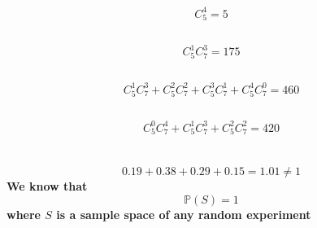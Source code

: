 \documentclass{article}
\begin{document}
    \section{}
        \subsection{}
            \paragraph{
                $$C_5^4=5$$
            }
        \subsection{}
            \paragraph{
                $$C_5^1C_7^3=175$$
            }
        \subsection{}
            \paragraph{
                $$C_5^1C_7^3+C_5^2C_7^2+C_5^3C_7^1+C_5^4C_7^0=460$$
            }
        \subsection{}
            \paragraph{
                $$C_5^0C_7^4+C_5^1C_7^3+C_5^2C_7^2=420$$
            }
    \section{}
        \subsection{}
            \paragraph{
                $$0.19+0.38+0.29+0.15=1.01\neq 1$$
                We know that $$\mathbb{P}(S)=1$$ where $S$ is a sample space of any random experiment
            }
        \subsection{}
\end{document}
